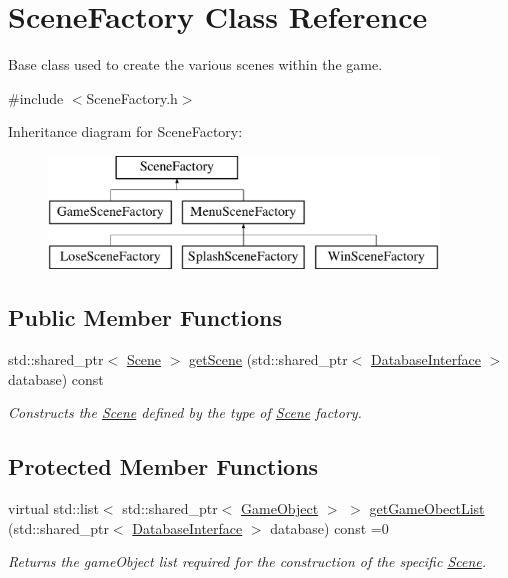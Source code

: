 \hypertarget{class_scene_factory}{}\section{Scene\+Factory Class Reference}
\label{class_scene_factory}


Base class used to create the various scenes within the game.  




{\ttfamily \#include $<$Scene\+Factory.\+h$>$}

Inheritance diagram for Scene\+Factory\+:\begin{figure}[H]
\begin{center}
\leavevmode
\includegraphics[height=3.000000cm]{d8/d70/class_scene_factory}
\end{center}
\end{figure}
\subsection*{Public Member Functions}
\begin{DoxyCompactItemize}
\item 
std\+::shared\+\_\+ptr$<$ \hyperlink{class_scene}{Scene} $>$ \hyperlink{class_scene_factory_a9721384ff0d8703f0ef28bf9061fe402}{get\+Scene} (std\+::shared\+\_\+ptr$<$ \hyperlink{class_database_interface}{Database\+Interface} $>$ database) const
\begin{DoxyCompactList}\small\item\em Constructs the \hyperlink{class_scene}{Scene} defined by the type of \hyperlink{class_scene}{Scene} factory. \end{DoxyCompactList}\end{DoxyCompactItemize}
\subsection*{Protected Member Functions}
\begin{DoxyCompactItemize}
\item 
virtual std\+::list$<$ std\+::shared\+\_\+ptr$<$ \hyperlink{class_game_object}{Game\+Object} $>$ $>$ \hyperlink{class_scene_factory_a2c8541230e95df49d2ab39b7c6ecdb78}{get\+Game\+Obect\+List} (std\+::shared\+\_\+ptr$<$ \hyperlink{class_database_interface}{Database\+Interface} $>$ database) const =0
\begin{DoxyCompactList}\small\item\em Returns the game\+Object list required for the construction of the specific \hyperlink{class_scene}{Scene}. \end{DoxyCompactList}\end{DoxyCompactItemize}


